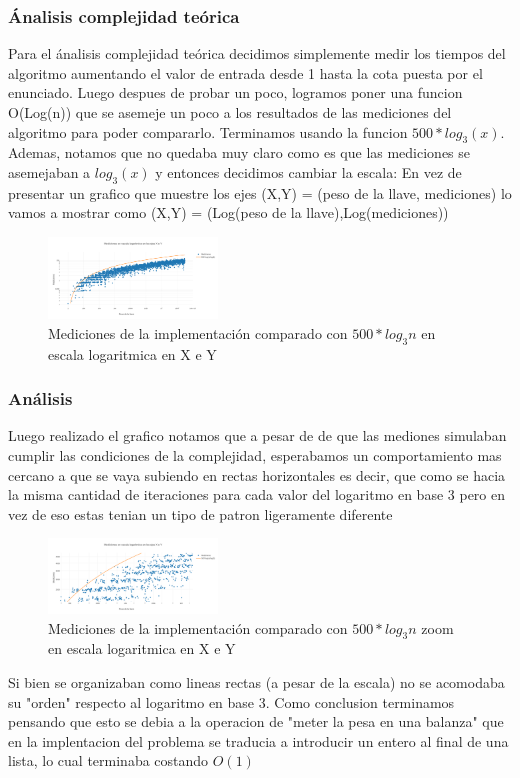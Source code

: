 \documentclass[spanish,12pt]{article}
\begin{document}
\subsubsection{\'Analisis complejidad te\'orica}
 Para el \'analisis complejidad te\'orica decidimos simplemente medir los tiempos del algoritmo aumentando el valor de entrada desde 1 hasta la cota puesta por el enunciado.
  Luego despues de probar un poco, logramos poner una funcion O(Log(n)) que se asemeje un poco a los resultados de las mediciones del algoritmo para poder compararlo.
  Terminamos usando la funcion $500*log_3(x)$.
  Ademas, notamos que no quedaba muy claro como es que las mediciones se asemejaban a $log_3(x)$ y entonces decidimos cambiar la escala:
  En vez de presentar un grafico que muestre los ejes (X,Y) = (peso de la llave, mediciones) lo vamos a mostrar como (X,Y) = (Log(peso de la llave),Log(mediciones))

	\begin{figure}[H]
	\centering
	\includegraphics[width=0.4\textwidth]{punto2-mediciones}
	\caption{Mediciones de la implementaci\'on comparado con $500*log_{3}{n}$ en escala logaritmica en X e Y}
	\end{figure}



\subsubsection{Análisis}
Luego realizado el grafico notamos que a pesar de de que las mediones simulaban cumplir las condiciones de la complejidad, esperabamos un comportamiento mas cercano a que se vaya subiendo en rectas horizontales
es decir, que como se hacia la misma cantidad de iteraciones para cada valor del logaritmo en base 3 pero en vez de eso  estas tenian un tipo de patron ligeramente diferente

\begin{figure}[H]
\centering
\includegraphics[width=0.4\textwidth]{punto2-zoom}
\caption{Mediciones de la implementaci\'on comparado con $500*log_{3}{n}$ zoom en escala logaritmica en X e Y }
\end{figure}
Si bien se organizaban como lineas rectas (a pesar de la escala) no se acomodaba su "orden" respecto al logaritmo en base 3.
Como conclusion terminamos pensando que esto se debia a la operacion de "meter la pesa en una balanza" que en la implentacion del problema se traducia a introducir un entero al final de una lista, lo cual terminaba costando $O(1)$
\end{document}

